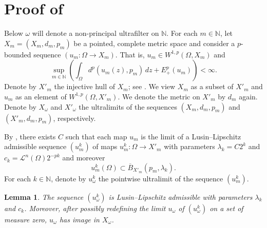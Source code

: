 \documentclass[a4paper,leqno]{amsart}
\numberwithin{equation}{section}
\newtheorem{lemma}[theorem]{Lemma}
\theoremstyle{remark}
\theoremstyle{remark}
\newcommand{\N}{\mathbb{N}}
\newcommand{\lm}{\mathscr{L}}
\begin{document}
\section{Proof of }\label{section-the-ultralimit-construction}
Below $\omega$ will denote a non-principal ultrafilter on $\N$. For each $m\in\N$, let $X_m=(X_m, d_m, p_m)$ be a pointed, complete metric space and consider a $p$-bounded sequence $(u_m \colon \Omega \to X_m)$. That is, $u_m\in W^{1,p}(\Omega, X_m)$ and $$\sup_{m\in\N}\left(\int_\Omega d^p(u_m(z), p_m)\,dz+ E_+^p(u_m)\right)<\infty.$$
Denote by $X'_m$ the injective hull of $X_m$; see . We view $X_m$ as a subset of $X'_m$ and $u_m$ as an element of $W^{1,p}(\Omega, X'_m)$. We denote the metric on $X'_m$ by $d_m$ again. Denote by $X_\omega$ and $X'_\omega$ the ultralimits of the sequences $(X_m, d_m, p_m)$ and $(X'_m, d_m, p_m)$, respectively. 

By , there exists $C$ such that each map $u_m$ is the limit of a Lusin--Lipschitz admissible sequence $(u_m^k)$ of maps $u_m^k\colon\Omega\to X'_m$ with parameters $\lambda_k=C2^k$ and $c_k=\lm^{n}(\Omega)2^{-pk}$ and moreover $$u_m^k(\Omega)\subset \overline{B}_{X'_m}(p_m, \lambda_k).$$ For each $k\in\N$, denote by $u_\omega^k$ the pointwise ultralimit of the sequence $(u_m^k)$.

\begin{lemma}\label{lemma-image-is-in-the-correct-place}
    The sequence $( u_\omega^k )$ is Lusin--Lipschitz admissible with parameters $\lambda_k$ and $c_k$. Moreover, after possibly redefining the limit $u_\omega$ of $( u_\omega^k )$ on a set of measure zero, $u_\omega$ has image in $X_\omega$.
\end{lemma}
\end{document}
